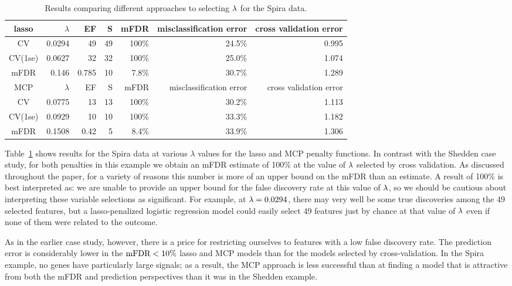\begin{table}[htb!]
\centering
\begin{tabular}{c | r r r r r r }
  \hline
lasso & $\lambda$ & EF & S & mFDR & misclassification error & cross validation error \\ 
	\hline
	CV & 0.0294 & 49 & 49 & 100\% & 24.5\% & 0.995 \\
	CV(1se) & 0.0627 & 32 & 32 & 100\% & 25.0\% & 1.074 \\
	mFDR & 0.146 & 0.785 & 10 & 7.8\% &  30.7\% & 1.289 \\
\hline
MCP & $\lambda$ & EF & S & mFDR & misclassification error & cross validation error \\
	\hline
	CV & 0.0775 & 13 & 13 & 100\% & 30.2\% & 1.113 \\
	CV(1se) & 0.0929 & 10 & 10 & 100\% & 33.3\% & 1.182 \\
	mFDR & 0.1508 & 0.42 & 5 & 8.4\% &  33.9\% & 1.306 \\
		\hline
\end{tabular}
\caption{\label{Tab:spira} Results comparing different approaches to selecting $\lambda$ for the Spira data.}
\end{table}

Table~\ref{Tab:spira} shows results for the Spira data at various $\lambda$ values for the lasso and MCP penalty functions.  In contrast with the Shedden case study, for both penalties in this example we obtain an mFDR estimate of 100\% at the value of $\lambda$ selected by cross validation.  As discussed throughout the paper, for a variety of reasons this number is more of an upper bound on the mFDR than an estimate.  A result of 100\% is best interpreted as: we are unable to provide an upper bound for the false discovery rate at this value of $\lambda$, so we should be cautious about interpreting these variable selections as significant.  For example, at $\lambda=0.0294$, there may very well be some true discoveries among the 49 selected features, but a lasso-penalized logistic regression model could easily select 49 features just by chance at that value of $\lambda$ even if none of them were related to the outcome.

As in the earlier case study, however, there is a price for restricting ourselves to features with a low false discovery rate.  The prediction error is considerably lower in the $\textrm{mFDR} < 10\%$ lasso and MCP models than for the models selected by cross-validation.  In the Spira example, no genes have particularly large signals; as a result, the MCP approach is less successful than at finding a model that is attractive from both the mFDR and prediction perspectives than it was in the Shedden example.

